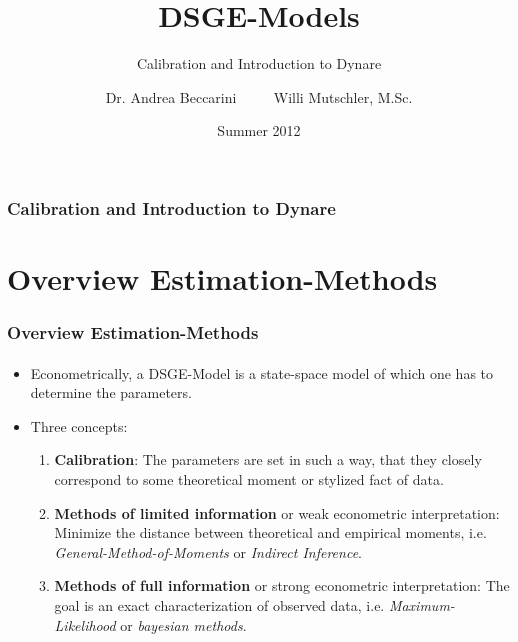 \documentclass{beamer} %
\begin{document}
\author[Willi Mutschler]{Dr. Andrea Beccarini $\qquad$ Willi Mutschler, M.Sc.}
\date{Summer 2012}
\title{DSGE-Models}
\subtitle{Calibration and Introduction to Dynare}

\begin{frame}
\titlepage
\end{frame}

\begin{frame}\frametitle{Calibration and Introduction to Dynare}
\tableofcontents
\end{frame}

\section{Overview Estimation-Methods}
\begin{frame}\frametitle{Overview Estimation-Methods}\framesubtitle{}
\begin{itemize}
    \item Econometrically, a DSGE-Model is a state-space model of which
        one has to determine the parameters.
      \item Three concepts:
      \begin{enumerate}
        \item \textbf{Calibration}: The parameters are set in such a
            way, that they closely correspond to some theoretical
            moment or stylized fact of data.
        \item \textbf{Methods of limited information} or weak
            econometric interpretation: Minimize the distance between
            theoretical and empirical moments, i.e.
            \emph{General-Method-of-Moments} or \emph{Indirect
            Inference}.
        \item \textbf{Methods of full information} or strong
            econometric interpretation: The goal is an exact
            characterization of observed data, i.e.
            \emph{Maximum-Likelihood} or \emph{bayesian methods}.
      \end{enumerate}
\end{itemize}
\end{frame}
\end{document}
